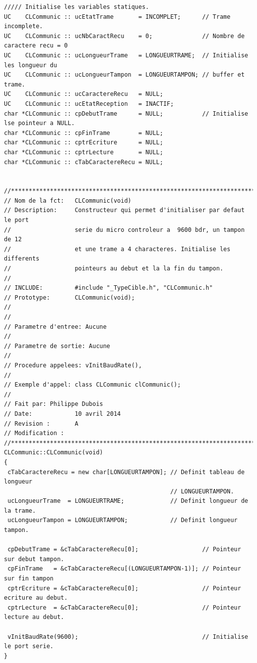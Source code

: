 \documentclass[10pt,a4paper,final]{article}
\begin{document}
\begin{lstlisting}[label={list:first},caption=Code source]
 ///// Initialise les variables statiques.
UC    CLCommunic :: ucEtatTrame       = INCOMPLET;      // Trame incomplete.
UC    CLCommunic :: ucNbCaractRecu    = 0;              // Nombre de caractere recu = 0
UC    CLCommunic :: ucLongueurTrame   = LONGUEURTRAME;  // Initialise les longueur du
UC    CLCommunic :: ucLongueurTampon  = LONGUEURTAMPON; // buffer et trame.
UC    CLCommunic :: ucCaractereRecu   = NULL;
UC    CLCommunic :: ucEtatReception   = INACTIF;
char *CLCommunic :: cpDebutTrame      = NULL;           // Initialise lse pointeur a NULL.
char *CLCommunic :: cpFinTrame        = NULL;
char *CLCommunic :: cptrEcriture      = NULL;
char *CLCommunic :: cptrLecture       = NULL;
char *CLCommunic :: cTabCaractereRecu = NULL;


//*****************************************************************************
// Nom de la fct:   CLCommunic(void)
// Description:     Constructeur qui permet d'initialiser par defaut le port
//                  serie du micro controleur a  9600 bdr, un tampon de 12
//                  et une trame a 4 characteres. Initialise les differents
//                  pointeurs au debut et la la fin du tampon.
//
// INCLUDE:         #include "_TypeCible.h", "CLCommunic.h"
// Prototype:       CLCommunic(void);
//
//
// Parametre d'entree: Aucune
//
// Parametre de sortie: Aucune
//
// Procedure appelees: vInitBaudRate(),
//
// Exemple d'appel: class CLCommunic clCommunic();
//
// Fait par: Philippe Dubois
// Date:            10 avril 2014
// Revision :       A
// Modification :
//*****************************************************************************
CLCommunic::CLCommunic(void)
{
 cTabCaractereRecu = new char[LONGUEURTAMPON]; // Definit tableau de longueur
                                               // LONGUEURTAMPON.
 ucLongueurTrame  = LONGUEURTRAME;             // Definit longueur de la trame.
 ucLongueurTampon = LONGUEURTAMPON;            // Definit longueur tampon.

 cpDebutTrame = &cTabCaractereRecu[0];                  // Pointeur sur debut tampon.
 cpFinTrame   = &cTabCaractereRecu[(LONGUEURTAMPON-1)]; // Pointeur sur fin tampon
 cptrEcriture = &cTabCaractereRecu[0];                  // Pointeur ecriture au debut.
 cptrLecture  = &cTabCaractereRecu[0];                  // Pointeur lecture au debut.

 vInitBaudRate(9600);                                   // Initialise le port serie.
}



\end{lstlisting}
\end{document}
